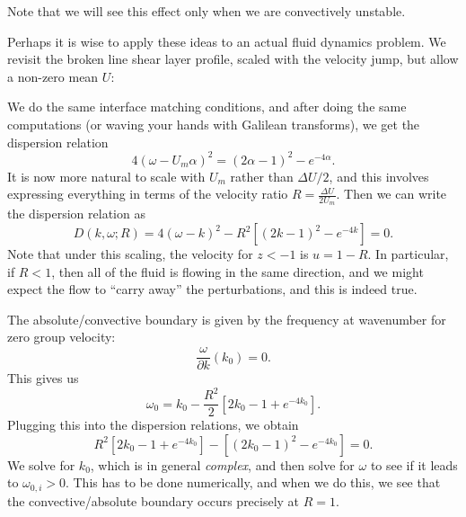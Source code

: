 \documentclass[a4paper]{article}
\begin{document}
Note that we will see this effect only when we are convectively unstable.

%
Perhaps it is wise to apply these ideas to an actual fluid dynamics problem. We revisit the broken line shear layer profile, scaled with the velocity jump, but allow a non-zero mean $U$:
\begin{center}
\end{center}
We do the same interface matching conditions, and after doing the same computations (or waving your hands with Galilean transforms), we get the dispersion relation
\[
  4 (\omega - U_m \alpha)^2 = (2\alpha - 1)^2 - e^{-4\alpha}.
\]
It is now more natural to scale with $U_m$ rather than $\Delta U/2$, and this involves expressing everything in terms of the velocity ratio $R = \frac{\Delta U}{2 U_m}$. Then we can write the dispersion relation as
\[
  D(k, \omega; R) = 4(\omega - k)^2 - R^2[(2k - 1)^2 - e^{-4k}] = 0.
\]
Note that under this scaling, the velocity for $z < -1$ is $u = 1 - R$. In particular, if $R < 1$, then all of the fluid is flowing in the same direction, and we might expect the flow to ``carry away'' the perturbations, and this is indeed true.

The absolute/convective boundary is given by the frequency at wavenumber for zero group velocity:
\[
  \frac{\omega}{\partial k}(k_0) = 0.
\]
This gives us
\[
  \omega_0 = k_0 - \frac{R^2}{2} [2k_0 - 1 + e^{-4k_0}].
\]
Plugging this into the dispersion relations, we obtain
\[
  R^2 [2k_0 - 1 + e^{-4k_0}] - [(2k_0 -1 )^2 - e^{-4k_0}] = 0.
\]
We solve for $k_0$, which is in general \emph{complex}, and then solve for $\omega$ to see if it leads to $\omega_{0, i} > 0$. This has to be done numerically, and when we do this, we see that the convective/absolute boundary occurs precisely at $R = 1$.
\end{document}
